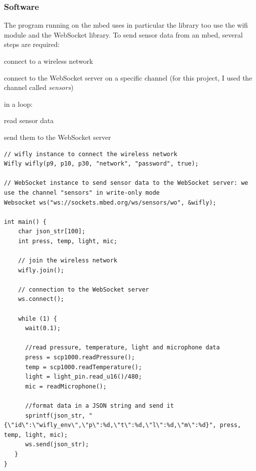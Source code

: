 \documentclass[pdftex,10pt,a4paper]{report}
\newenvironment{packed_item}{
\begin{itemize}
  \setlength{\itemsep}{1pt}
  \setlength{\parskip}{0pt}
  \setlength{\parsep}{0pt}
}{\end{itemize}}
\begin{document}
\subsubsection{Software}
The program running on the mbed uses in particular the library too use the wifi module and the WebSocket library. To send sensor data from an mbed, several steps are required:
\begin{packed_item}
	\item connect to a wireless network
	\item connect to the WebSocket server on a specific channel (for this project, I used the channel called \textit{sensors})
	\item in a loop:
		\begin{packed_item}
			\item read sensor data
			\item send them to the WebSocket server
		\end{packed_item}
\end{packed_item}


\begin{center}
\begin{lstlisting}[label=Streaming data code example,caption=Streaming data code example]
// wifly instance to connect the wireless network
Wifly wifly(p9, p10, p30, "network", "password", true);

// WebSocket instance to send sensor data to the WebSocket server: we use the channel "sensors" in write-only mode
Websocket ws("ws://sockets.mbed.org/ws/sensors/wo", &wifly);

int main() {
    char json_str[100];
    int press, temp, light, mic;
    
    // join the wireless network
    wifly.join();
    		
    // connection to the WebSocket server
    ws.connect();
    		
    while (1) {
      wait(0.1);

      //read pressure, temperature, light and microphone data
      press = scp1000.readPressure();
      temp = scp1000.readTemperature();
      light = light_pin.read_u16()/480;
      mic = readMicrophone();

      //format data in a JSON string and send it
      sprintf(json_str, "{\"id\":\"wifly_env\",\"p\":%d,\"t\":%d,\"l\":%d,\"m\":%d}", press, temp, light, mic);
      ws.send(json_str);
   }
}
\end{lstlisting}
\end{center}
\end{document}
